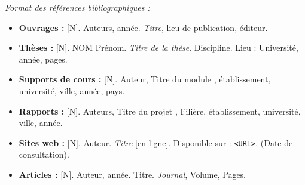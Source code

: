 \documentclass[12pt, a4paper, oneside]{report}
\begin{document}












\printbibliography[heading=bibintoc, title={Bibliographie}]

\vspace{1cm}
\noindent\textcolor{iacsGray}{\small\textit{Format des références bibliographiques :}}

\begin{itemize}[leftmargin=1.5em, itemsep=2pt, label=\textcolor{iacsPrimary}{\textbullet}]
  \item \textbf{Ouvrages :}
    {[N]}. Auteurs, année. \textit{Titre}, lieu de publication, éditeur.

  \item \textbf{Thèses :}
    {[N]}. NOM Prénom. \textit{Titre de la thèse}. Discipline. Lieu : Université, année, pages.

  \item \textbf{Supports de cours :}
    {[N]}. Auteur, \og Titre du module \fg{}, établissement, université, ville, année, pays.

  \item \textbf{Rapports :}
    {[N]}. Auteurs, \og Titre du projet \fg{}, Filière, établissement, université, ville, année.

  \item \textbf{Sites web :}
    {[N]}. Auteur. \textit{Titre} [en ligne]. Disponible sur : \texttt{<URL>}. (Date de consultation).

  \item \textbf{Articles :}
    {[N]}. Auteur, année. Titre. \textit{Journal}, Volume, Pages.
\end{itemize}


\appendix
\end{document}
